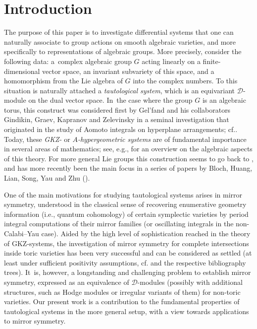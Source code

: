 \documentclass[11pt]{article}
\newcommand{\ie}{i.e.,\xspace}
\newcommand{\cf}{cf.\xspace}
\begin{document}
\section{Introduction} \label{sec:intro}

The purpose of this paper is to investigate differential systems that
one can naturally associate to group actions on smooth algebraic
varieties, and more specifically to representations of algebraic
groups. More precisely, consider
the following data: a~complex algebraic group $G$
acting linearly on a finite-dimensional vector space, an invariant
subvariety of this space, and a homomorphism from the Lie algebra of
$G$ into the complex numbers. To this situation is naturally
attached a \emph{tautological system}, which is an equivariant
$\mathscr{D}$\nobreakdash-mod\-ule on the dual vector space. In~the case where the group $G$
is an algebraic torus, this construct
was considered first by Gel'fand and his collaborators
Gindikin, Graev, Kapranov and Zelevinsky in a seminal investigation
that originated in the study of Aomoto integrals on hyperplane
arrangements; \cf \cite{GGG80,GG86,GZ86,GGZ87,GKZ89,GKZ90}. Today,
these \emph{GKZ-} or \emph{$A$-hypergeometric systems} are of
fundamental importance in several areas of mathematics; see, e.g.,
\cite{GKZReview} for an overview on the algebraic aspects of this
theory.
For more general Lie groups this construction seems to
go back to \cite[\S II.4]{Hot98}, and has more recently been the
main focus in a series of papers by Bloch, Huang, Lian, Song, Yau and
Zhu (\cite{TautPeriod1, Bloch_HolRankProb, TautPeriod2,
HuangLianZhu}).

One of the main motivations for studying
tautological systems arises in mirror symmetry, understood in the
classical sense of recovering enumerative geometry information (\ie quantum cohomology) of certain symplectic varieties by period integral
computations of their mirror families (or oscillating integrals in the
non-Calabi--Yau case). Aided by the high level of
sophistication reached in the theory of GKZ-systems, the
investigation of mirror symmetry for
complete intersections inside toric varieties has been very
successful and can be considered as
settled (at least under sufficient positivity assumptions, \cf \cite{Giv7, Iritani, RS12} and the respective bibliography trees). It~is, however, a longstanding and
challenging problem to establish mirror symmetry, expressed as an
equivalence of $\mathscr{D}$\nobreakdash-mod\-ules (possibly with additional
structures, such as Hodge modules or irregular variants of them) for
non-toric varieties. Our present work is a contribution to the
fundamental properties of tautological systems in the more general
setup, with a view towards applications to mirror symmetry.
\end{document}
